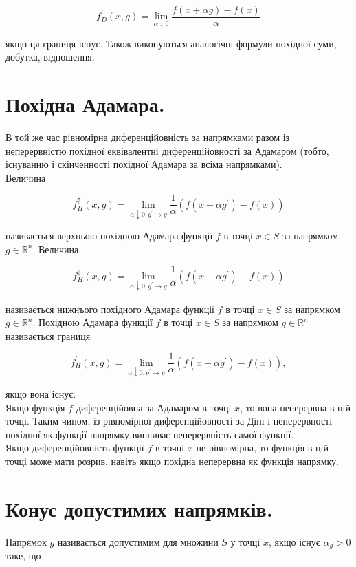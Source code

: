 \documentclass[10pt]{article}
\begin{document}
$$
f_{D}^{\prime}(x, g)=\lim _{\alpha \downarrow 0} \frac{f(x+\alpha g)-f(x)}{\alpha}
$$

якщо ця границя існує. Також виконуються аналогічні формули похідної суми, добутка, відношення.

\section*{Похідна Адамара.}
В той же час рівномірна диференційовність за напрямками разом із неперервністю похідної еквівалентні диференційовності за Адамаром (тобто, існуванню і скінченності похідної Адамара за всіма напрямками).\\
Величина

$$
f_{H}^{\uparrow}(x, g)=\lim _{\alpha \downarrow 0, g^{\prime} \rightarrow g} \frac{1}{\alpha}\left(f\left(x+\alpha g^{\prime}\right)-f(x)\right)
$$

називається верхньою похідною Адамара функції $f$ в точці $x \in S$ за напрямком $g \in \mathbb{R}^{n}$. Величина

$$
f_{H}^{\downarrow}(x, g)=\lim _{\underline{\alpha \downarrow 0, g^{\prime} \rightarrow g}} \frac{1}{\alpha}\left(f\left(x+\alpha g^{\prime}\right)-f(x)\right)
$$

називається нижнъого похідного Адамара функції $f$ в точці $x \in S$ за напрямком $g \in \mathbb{R}^{n}$. Похідною Адамара функції $f$ в точці $x \in S$ за напрямком $g \in \mathbb{R}^{n}$ називається границя

$$
f_{H}^{\prime}(x, g)=\lim _{\alpha \downarrow 0, g^{\prime} \rightarrow g} \frac{1}{\alpha}\left(f\left(x+\alpha g^{\prime}\right)-f(x)\right),
$$

якщо вона існує.\\
Якщо функція $f$ диференційовна за Адамаром в точці $x$, то вона неперервна в цій точці. Таким чином, із рівномірної диференційовності за Діні і неперервності похідної як функції напрямку випливає неперервність самої функції.\\
Якщо диференційовність функції $f$ в точці $x$ не рівномірна, то функція в цій точці може мати розрив, навіть якщо похідна неперервна як функція напрямку.

\section*{Конус допустимих напрямків.}
Напрямок $g$ називається допустимим для множини $S$ у точці $x$, якщо існує $\alpha_{g}>0$ таке, що
\end{document}
